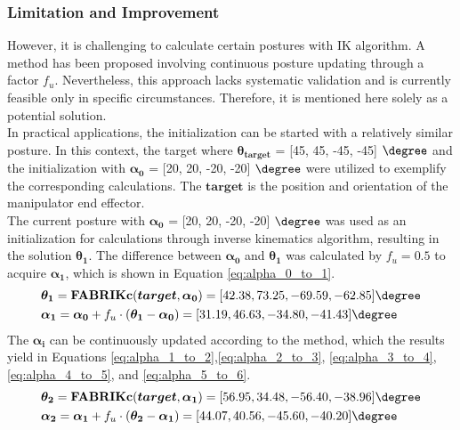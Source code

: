 \subsubsection{Limitation and Improvement}
However, it is challenging to calculate certain postures with IK algorithm. A method has 
been proposed involving continuous posture updating through a factor $f_u$. Nevertheless, this approach 
lacks systematic validation and is currently feasible only in specific circumstances. Therefore, it is 
mentioned here solely as a potential solution. \\
In practical applications, the initialization can be started with a relatively similar posture. 
In this context, the target where $\boldsymbol{\theta_{target}}$ = 
[45, 45, -45, -45] $\degree$ and the initialization with $\boldsymbol{\alpha_0}$ = [20, 20, -20, -20] $\degree$ 
were utilized to exemplify the corresponding calculations. The $\boldsymbol{target}$ is the position and 
orientation of the manipulator end effector. \\
The current posture with $\boldsymbol{\alpha_0}$  = [20, 20, -20, -20] $\degree$ was used as an initialization 
for calculations through inverse kinematics algorithm, resulting in the solution $\boldsymbol{\theta_1}$. 
The difference between $\boldsymbol{\alpha_0}$ and $\boldsymbol{\theta_1}$ was calculated by $f_u = 0.5$ to acquire 
$\boldsymbol{\alpha_1}$, which is shown in Equation \ref{eq:alpha_0_to_1}.
\begin{align}
    &\boldsymbol{\theta_1} = \textbf{FABRIKc}(\boldsymbol{target}, \boldsymbol{\alpha_0}) 
    = [42.38, 73.25, -69.59, -62.85]\degree \nonumber \\
    &\boldsymbol{\alpha_1} = \boldsymbol{\alpha_0} + f_u \cdot (\boldsymbol{\theta_1} - \boldsymbol{\alpha_0}) 
    = [31.19, 46.63, -34.80, -41.43]\degree
    \label{eq:alpha_0_to_1}
\end{align}
The $\boldsymbol{\alpha_i}$ can be continuously updated according to the method, which the results yield in Equations 
\ref{eq:alpha_1_to_2},\ref{eq:alpha_2_to_3}, \ref{eq:alpha_3_to_4}, \ref{eq:alpha_4_to_5}, and \ref{eq:alpha_5_to_6}.
\begin{align}
    &\boldsymbol{\theta_2} = \textbf{FABRIKc}(\boldsymbol{target}, \boldsymbol{\alpha_1}) 
    = [56.95, 34.48, -56.40, -38.96]\degree \nonumber \\
    &\boldsymbol{\alpha_2} = \boldsymbol{\alpha_1} + f_u \cdot (\boldsymbol{\theta_2} - \boldsymbol{\alpha_1}) 
    = [44.07, 40.56, -45.60, -40.20]\degree
    \label{eq:alpha_1_to_2}
\end{align}
